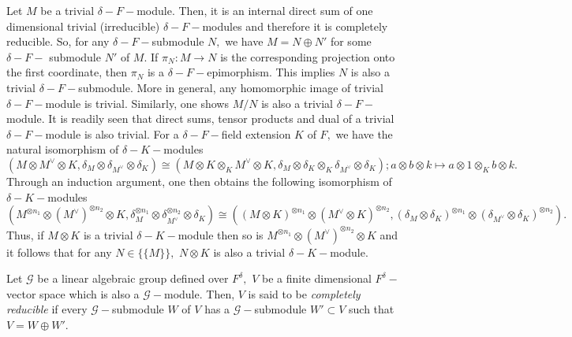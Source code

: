 \documentclass[preprint, 11pt]{amsart}
\theoremstyle{corollary}
\theoremstyle{remark}
\theoremstyle{proposition}
\numberwithin{equation}{subsection}
\begin{document}
Let $M$ be a trivial $\delta-F-$module. Then, it is an internal direct sum of one dimensional trivial (irreducible) $\delta-F-$modules and therefore it is completely reducible. So, for any $\delta-F-$submodule $N,$ we have $M=N\oplus N'$ for some $\delta-F-$ submodule $N'$ of $M.$ If $\pi_N: M\to N$ is the corresponding projection onto the first coordinate, then $\pi_N$ is a $\delta-F-$epimorphism. This implies $N$ is also  a trivial $\delta-F-$submodule. More in general, any homomorphic image of trivial $\delta-F-$module is trivial. Similarly, one shows $M/N$ is also a trivial $\delta-F-$module. It is readily seen that direct sums, tensor products and dual of a trivial $\delta-F-$module is also trivial.  For a $\delta-F-$field extension $K$ of $F,$ we have the natural isomorphism of $\delta-K-$modules $$(M\otimes M^\vee\otimes K, \delta_M\otimes \delta_{M^{\vee}}\otimes \delta_K) \cong (M\otimes K\otimes _K M^\vee\otimes K, \delta_M\otimes \delta_K\otimes_K \delta_{M^{\vee}}\otimes \delta_K); a\otimes b\otimes k\mapsto a\otimes 1\otimes_K b\otimes k.$$ 
Through an induction argument, one then obtains 
 the following isomorphism of $\delta-K-$modules	$$(M^{\otimes n_1}\otimes (M^{\vee})^{\otimes n_2} \otimes K , \delta^{\otimes n_1}_M\otimes  \delta^{\otimes n_2}_{M^{\vee}}\otimes 
 \delta_K)\cong ((M\otimes K)^{\otimes n_1} \otimes (M^{\vee}\otimes K)^{\otimes n_2}, (\delta_M \otimes \delta_K)^{\otimes n_1}\otimes(\delta_{M^{\vee}}\otimes \delta_K)^{\otimes n_2}).$$  Thus, if $M\otimes K$ is a trivial $\delta-K-$module then so is  $M^{\otimes n_1}\otimes (M^{\vee})^{\otimes n_2} \otimes K$ and it follows that for any $N\in \{\{M\}\},$ $N\otimes K$ is also a trivial $\delta-K-$module.


Let $\mathscr G$ be a linear algebraic group  defined over $F^{\delta},$ $V$ be a  finite dimensional $F^{\delta}-$vector space which is also a $\mathscr{G}-$module. Then, $V$ is said to be \emph{completely reducible} if every $\mathscr{G}-$submodule $W$ of $V$ has a $\mathscr{G}-$submodule $W'\subset V$ such that $V=W\oplus W'.$
\end{document}
